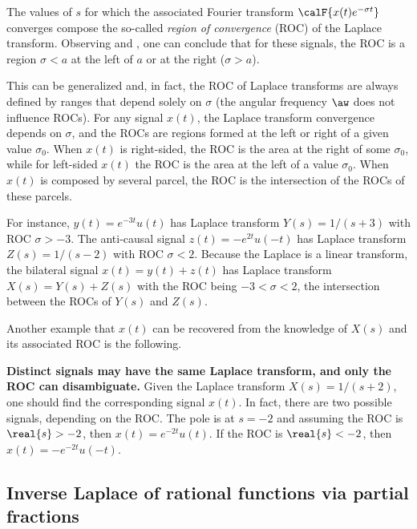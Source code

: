 The values of $s$ for which the associated Fourier transform $\calF\{x(t) e^{-\sigma t}\}$ converges compose the so-called \emph{region of convergence} (ROC) of the Laplace transform. 
Observing  and , one can conclude that for these signals, the ROC is a region $\sigma < a$ at the left of $a$ or at the right ($\sigma > a$). 

This can be 
generalized and, in fact, the ROC of Laplace transforms are always defined by ranges that depend solely on $\sigma$ (the angular frequency $\aw$ does not influence ROCs).
For any signal $x(t)$, the Laplace transform convergence depends on $\sigma$, and the ROCs are regions formed at the left or right of a given value $\sigma_0$. When $x(t)$ is right-sided, the ROC is the area at the right of some $\sigma_0$, while for left-sided $x(t)$ the ROC is the area at the left of a value $\sigma_0$. When $x(t)$ is composed by several parcel, the ROC is the intersection of the
ROCs of these parcels.

For instance, $y(t)=e^{-3t} u(t)$ has Laplace transform $Y(s)=1/(s+3)$ with ROC $\sigma > -3$.
The anti-causal signal $z(t)=-e^{2t} u(-t)$ has Laplace transform $Z(s)=1/(s-2)$ with ROC $\sigma < 2$.
Because the Laplace is a linear transform, the bilateral signal $x(t)=y(t)+z(t)$
has Laplace transform $X(s)=Y(s)+Z(s)$ with the ROC being $-3 < \sigma < 2$, the intersection between
the ROCs of $Y(s)$ and $Z(s)$.

Another example that $x(t)$ can be recovered from the knowledge of $X(s)$ and its associated ROC is the following.

\bExample \textbf{Distinct signals may have the same Laplace transform, and only the ROC can disambiguate.}
\label{ex:roc_disambiguates}
Given the Laplace transform $X(s)=1/(s+2)$, one should find the corresponding signal $x(t)$. In fact, there are two possible signals, depending on the ROC. The pole is at $s=-2$ and assuming the ROC is $\real{s}>-2$, then $x(t)=e^{-2t} u(t)$. If the ROC is $\real{s}<-2$, then $x(t)=-e^{-2t} u(-t)$.
\eExample


\subsection{Inverse Laplace of rational functions via partial fractions}
\label{sec:inverse_laplace}

